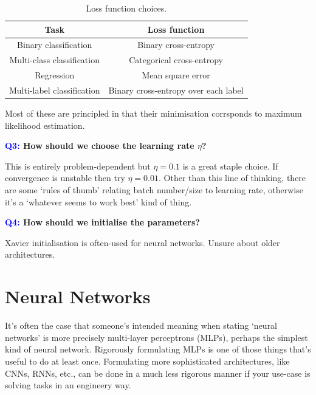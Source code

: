 \documentclass[11pt]{article}
\begin{document}
\begin{table}[ht]
    \begin{center}
        \begin{tabular}{c||c}
            \textbf{Task} & \textbf{Loss function}\\
            \hline
            \hline
            Binary classification & Binary cross-entropy\\
            Multi-class classification & Categorical cross-entropy\\
            Regression & Mean square error\\
            Multi-label classification & Binary cross-entropy over each label\\
            \hline
        \end{tabular}
    \end{center}
    \vspace{-15pt}
    \caption{Loss function choices.}
    \label{tab:loss_func_choices}
\end{table}
\noindent Most of these are principled in that their minimisation corrsponds to maximum likelihood estimation.

\begin{center}
    \textbf{\textcolor{blue}{Q3:} How should we choose the learning rate $\eta$?}
\end{center}
This is entirely problem-dependent but $\eta=0.1$ is a great staple choice. If convergence is unstable then try $\eta=0.01$. Other than this line of thinking, there are some `rules of thumb' relating batch number/size to learning rate, otherwise it's a `whatever seems to work best' kind of thing.

\begin{center}
    \textbf{\textcolor{blue}{Q4:} How should we initialise the parameters?}
\end{center}
Xavier initialisation is often-used for neural networks. Unsure about older architectures.

\section{Neural Networks}
It's often the case that someone's intended meaning when stating `neural networks' is more precisely multi-layer perceptrons (MLPs), perhaps the simplest kind of neural network. Rigorously formulating MLPs is one of those things that's useful to do at least once. Formulating more sophisticated architectures, like CNNs, RNNs, etc., can be done in a much less rigorous manner if your use-case is solving tasks in an engineery way.\\
\end{document}
